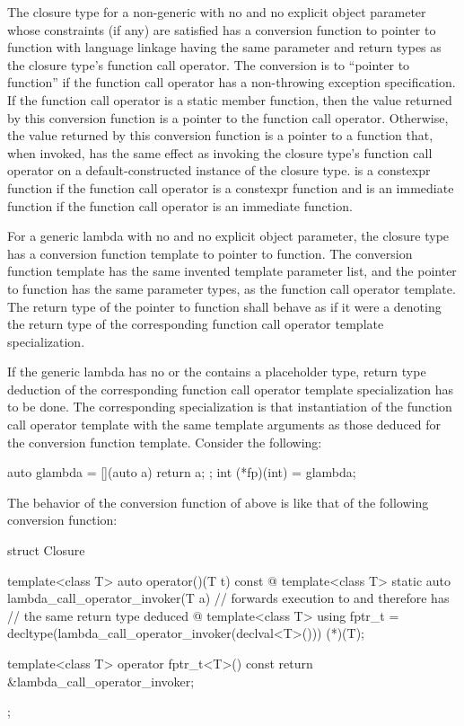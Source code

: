 \pnum
The closure type for a non-generic  with no
and no explicit object parameter
whose constraints (if any) are satisfied
has a conversion function to pointer to
function with \Cpp{} language linkage having
the same parameter and return types as the closure type's function call operator.
The conversion is to ``pointer to  function''
if the function call operator
has a non-throwing exception specification.
If the function call operator is a static member function,
then the value returned by this conversion function is
a pointer to the function call operator.
Otherwise, the value returned by this conversion function
is a pointer to a function  that, when invoked,
has the same effect as invoking the closure type's function call operator
on a default-constructed instance of the closure type.
 is a constexpr function
if the function call operator is a constexpr function
and is an immediate function
if the function call operator is an immediate function.

\pnum
For a generic lambda with no 
and no explicit object parameter,
the closure type has a
conversion function template to
pointer to function. The conversion function template has the same invented
template parameter list, and the pointer to function has the same
parameter types, as the function call operator template.  The return type of
the pointer to function shall behave as if it were a
 denoting the return type of the corresponding
function call operator template specialization.

\pnum
\begin{note}
If the generic lambda has no  or
the  contains a placeholder type, return type
deduction of the corresponding function call operator template specialization
has to be done. The corresponding specialization is that instantiation of the
function call operator template with the same template arguments as those
deduced for the conversion function template.  Consider the following:
\begin{codeblock}
auto glambda = [](auto a) { return a; };
int (*fp)(int) = glambda;
\end{codeblock}
The behavior of the conversion function of  above is like
that of the following conversion function:
\begin{codeblock}
struct Closure {
  template<class T> auto operator()(T t) const { @\commentellip@ }
  template<class T> static auto lambda_call_operator_invoker(T a) {
    // forwards execution to  and therefore has
    // the same return type deduced
    @\commentellip@
  }
  template<class T> using fptr_t =
     decltype(lambda_call_operator_invoker(declval<T>())) (*)(T);

  template<class T> operator fptr_t<T>() const
    { return &lambda_call_operator_invoker; }
};
\end{codeblock}
\end{note}

